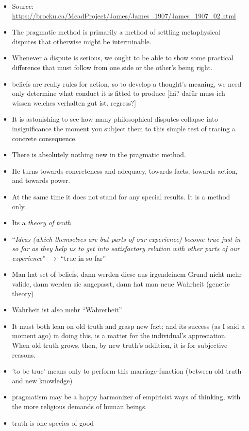\documentclass[emulatestandardclasses]{scrartcl}
\begin{document}
\begin{itemize}
  \item Source: \url{https://brocku.ca/MeadProject/James/James_1907/James_1907_02.html}
  \item The pragmatic method is primarily a method of settling metaphysical disputes that otherwise might be interminable. 
  \item Whenever a dispute is serious, we ought to be able to show some practical difference that must follow from one side or the other's being right.
  \item beliefs are really rules for action, so to develop a thought's meaning, we need only determine what conduct it is fitted to produce [hä? dafür muss ich wissen welches verhalten gut ist. regress?]
  \item It is astonishing to see how many philosophical disputes collapse into insignificance the moment you subject them to this simple test of tracing a concrete consequence.
  \item There is absolutely nothing new in the pragmatic method. 
  \item He turns towards concreteness and adequacy, towards facts, towards action, and towards power.
  \item At the same time it does not stand for any special results. It is a method only.
  \item Its a \emph{theory of truth}
  \item "`\emph{Ideas (which themselves are but parts of our experience) become true just in so far as they help us to get into satisfactory relation with other parts of our experience}"' $\rightarrow$ "`true in so far"'
  \item Man hat set of beliefs, dann werden diese aus irgendeinem Grund nicht mehr valide, dann werden sie angepasst, dann hat man neue Wahrheit (genetic theory)
  \item Wahrheit ist also mehr "`Wahrerheit"'
  \item It must both lean on old truth and grasp new fact; and its success (as I said a moment ago) in doing this, is a matter for the individual's appreciation. When old truth grows, then, by new truth's addition, it is for subjective reasons.
  \item  'to be true' means only to perform this marriage-function (between old truth and new knowledge)
  \item pragmatism may be a happy harmonizer of empiricist ways of thinking, with the more religious demands of human beings.
  \item truth is one species of good
\end{itemize}
\end{document}

